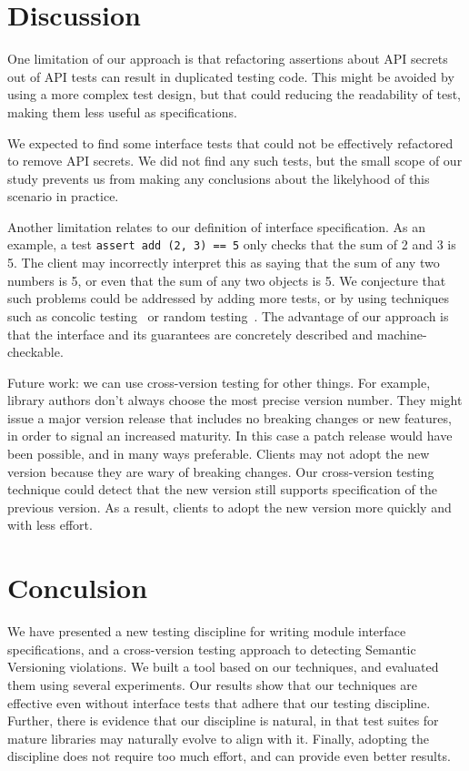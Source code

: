 \section{Discussion}
One limitation of our approach is that refactoring assertions about
API secrets out of API tests can result in duplicated testing
code. This might be avoided by using a more complex test design, but
that could reducing the readability of test, making them less useful
as specifications.

We expected to find some interface tests that could not be effectively
refactored to remove API secrets. We did not find any such tests, but
the small scope of our study prevents us from making any conclusions
about the likelyhood of this scenario in practice. 

Another limitation relates to our definition of interface
specification. As an example, a test \texttt{assert add (2, 3) == 5}
only checks that the sum of 2 and 3 is 5. The client may incorrectly
interpret this as saying that the sum of any two numbers is 5, or
even that the sum of any two objects is 5. We conjecture that such
problems could be addressed by adding more tests, or by using
techniques such as concolic testing~\cite{sen05-cute} or random
testing~\cite{quickcheck}. The advantage of our approach is that the
interface and its guarantees are concretely described and
machine-checkable.

Future work: we can use cross-version testing for other things. For
example, library authors don't always choose the most precise version
number. They might issue a major version release that includes no
breaking changes or new features, in order to signal an increased
maturity. In this case a patch release would have been possible, and
in many ways preferable. Clients may not adopt the new version because
they are wary of breaking changes. Our cross-version testing technique
could detect that the new version still supports specification of the
previous version. As a result, clients to adopt the new version more
quickly and with less effort.


\section{Conculsion} 
We have presented a new testing discipline for writing module
interface specifications, and a cross-version testing approach to
detecting Semantic Versioning violations. We built a tool based on our
techniques, and evaluated them using several experiments. Our results
show that our techniques are effective even without interface tests
that adhere that our testing discipline.  Further, there is evidence
that our discipline is natural, in that test suites for mature
libraries may naturally evolve to align with it. Finally, adopting the
discipline does not require too much effort, and can provide even
better results.

